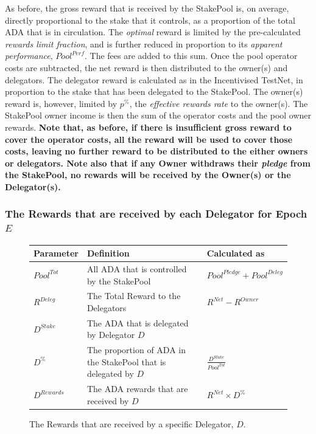 \documentclass[11pt,a4paper,dvipsnames,twosided,final]{article}
\newcommand{\ada}{ADA{}}
\begin{document}
\noindent
As before, the gross reward that is received by the StakePool is, on average, directly proportional to the
stake that it controls, as a proportion of the total \ada{} that is in circulation.
The \emph{optimal} reward is limited by the pre-calculated \emph{rewards limit fraction}, and is further reduced in
proportion to its \emph{apparent performance}, $\textit{Pool}^{\textit{Perf}}$.
The fees are added to this sum.
Once the pool operator costs are subtracted,
the net reward is then distributed to the owner(s) and delegators.
The delegator reward is calculated as in the Incentivised TestNet, in proportion to the stake that has
been delegated to the StakePool.
The owner(s) reward is, however, limited by $p^\%$, the \emph{effective rewards rate} to the owner(s).
%
The StakePool owner income is then the sum of the operator costs and the pool owner rewards.
\textbf{Note that, as before, if there is insufficient gross reward to cover the operator costs, all the reward will be used to cover those
costs, leaving no further reward to be distributed to the either owners or delegators.
Note also that if any Owner withdraws their \emph{pledge} from the StakePool, no rewards will be received by the Owner(s) or the Delegator(s).}

\subsubsection*{The Rewards that are received by each Delegator for Epoch $E$}

\begin{figure}[h!]
\begin{center}
\begin{tabular}{||l|p{9cm}|l||}
  \hline \hline
\textbf{Parameter} & \textbf{Definition} & \textbf{Calculated as} \\\hline
${\textit{Pool}}^{Tot}$ & All \ada{} that is controlled by the StakePool & ${\textit{Pool}}^\textit{Pledge} + {\textit{Pool}}^\textit{Deleg}$ \\\hline
$R^{Deleg}$ & The Total Reward to the Delegators & $R^{\textit{Net}} - R^\textit{Owner}$ \\\hline
$D^{Stake}$ & The \ada{} that is delegated by Delegator $D$ & \\\hline
$D^\%$ & The proportion of \ada{} in the StakePool that is delegated by $D$ & $\frac{D^{Stake}}{Pool^{Tot}}$ \\\hline
$D^{Rewards}$ & The \ada{} rewards that are received by $D$ & $R^{\textit{Net}} \times D^\%$ \\\hline
\hline
\end{tabular}
\end{center}
\caption{The Rewards that are received by a specific Delegator, $D$.}
\end{figure}
\end{document}
